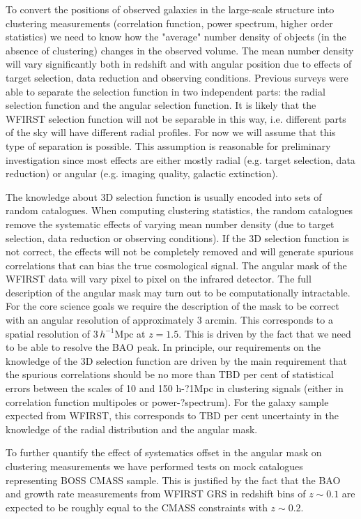  To convert the positions of observed galaxies in the large-scale structure
 into clustering measurements (correlation function, power spectrum, higher order
 statistics) we need to know how the "average" number density of objects (in the
 absence of clustering) changes in the observed volume. The mean number density
 will vary significantly both in redshift and with angular position due to
 effects of target selection, data reduction and observing conditions. Previous
 surveys were able to separate the selection function in two independent parts:
 the radial selection function and the angular selection function. It is likely
 that the WFIRST selection function will not be separable in this way, i.e.
 different parts of the sky will have different radial profiles. For now we will
 assume that this type of separation is possible. This assumption is reasonable
 for preliminary investigation since most effects are either mostly radial (e.g.
 target selection, data reduction) or angular (e.g. imaging quality, galactic
 extinction).

 The knowledge about 3D selection function is usually encoded into sets of random
 catalogues. When computing clustering statistics, the random catalogues remove
 the systematic effects of varying mean number density (due to target selection,
 data reduction or observing conditions). If the 3D selection function is not
 correct, the effects will not be completely removed and will generate spurious
 correlations that can bias the true cosmological signal. The angular mask of the
 WFIRST data will vary pixel to pixel on the infrared detector. The full
 description of the angular mask may turn out to be computationally intractable.
 For the core science goals we require the description of the mask to be correct
 with an angular resolution of approximately 3 arcmin. This corresponds to a
 spatial resolution of $3 \,h^{-1} \mathrm{Mpc}$ at $z=1.5$. This is driven by the fact that we
 need to be  able to resolve the BAO peak. In principle, our requirements on the
 knowledge of the 3D selection function are driven by the main requirement that
 the spurious correlations should be no more than TBD per cent of statistical
 errors between the scales of 10 and 150 h-­?1Mpc in clustering signals (either
 in correlation function multipoles or power-­?spectrum). For the galaxy sample
 expected from WFIRST, this corresponds to TBD per cent uncertainty in the
 knowledge of the radial distribution and the angular mask.

 To further quantify the effect of systematics offset in the angular mask on
 clustering measurements we have performed tests on mock catalogues representing
 BOSS CMASS sample. This is justified by the fact that the BAO and growth rate
 measurements from WFIRST GRS in redshift bins of $z\sim0.1$ are expected to be
 roughly equal to the CMASS constraints with $z\sim0.2$.

